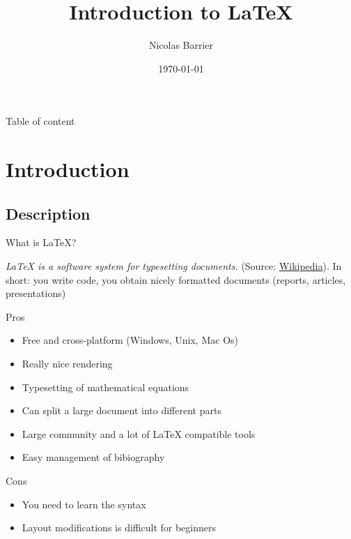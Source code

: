 \documentclass[10pt]{beamer}
\author{Nicolas Barrier}
\title{Introduction to \LaTeX}
\institute{
    UMR MARBEC
}
\date{\today}
\begin{document}
\lstset{style=mytex}

\frame{\titlepage}

\begin{frame}{Table of content}
\tableofcontents[hideallsubsections]
\end{frame}




\section{Introduction}
\subsection{Description}

\begin{frame}{What is \LaTeX{}?}

\emph{\LaTeX{} is a software system for typesetting documents.} (Source: \href{https://en.wikipedia.org/wiki/LaTeX}{Wikipedia}). In short: you write code, you obtain nicely formatted documents (reports, articles, presentations) \\

\begin{block}{Pros}
\begin{itemize}
\item{Free and cross-platform (Windows, Unix, Mac Os)}
\item{Really nice rendering}
\item{Typesetting of mathematical equations}
\item{Can split a large document into different parts}
\item{Large community and a lot of \LaTeX{} compatible tools}
\item{Easy management of bibiography}
\end{itemize}
\end{block}

\begin{alertblock}{Cons}
\begin{itemize}
\item{You need to learn the syntax}
\item{Layout modifications is difficult for beginners}
\end{itemize}

\end{alertblock}

\end{frame}
\end{document}
